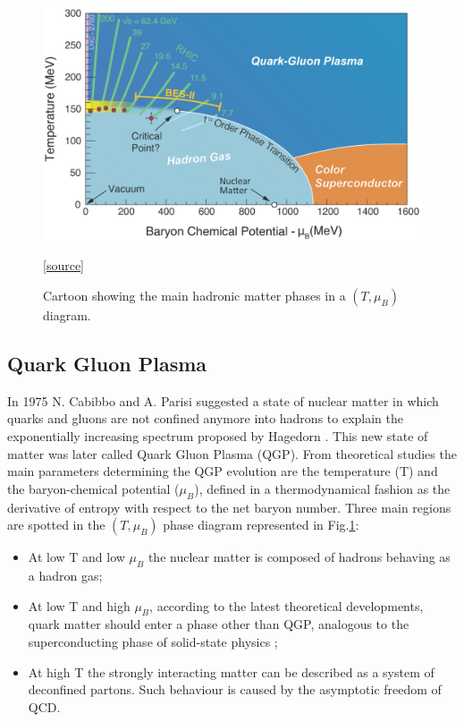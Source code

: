 \begin{figure}[!t]
\begin{center}
\includegraphics[width=0.85\linewidth]{Chapters/Introduction/Figs/QGPPhases.pdf}
\caption{Cartoon showing the main hadronic matter phases in a $(T,\mu_B)$ diagram.}
\href{https://deixismagazine.org/2016/06/early-universe-soup/dol_plasma/}{[source]}
\label{fig:QGPPhases}
\end{center}
\end{figure}

\subsection{Quark Gluon Plasma}
In 1975 N. Cabibbo and A. Parisi \cite{Cabibbo:1975ig} suggested a state of nuclear matter in which quarks and gluons are not confined anymore into hadrons to explain the exponentially increasing spectrum proposed by Hagedorn \cite{Hagedorn:1965st}.
This new state of matter was later called Quark Gluon Plasma (QGP).
From theoretical studies the main parameters determining the QGP evolution are the temperature (T) and the baryon-chemical potential ($\mu_B$), defined in a thermodynamical fashion as the derivative of entropy with respect to the net baryon number.
Three main regions are spotted in the $(T,\mu_B)$ phase diagram represented in Fig.\ref{fig:QGPPhases}:
\begin{itemize}
    \item At low T and low $\mu_B$ the nuclear matter is composed of hadrons behaving as a hadron gas;
    \item At low T and high $\mu_B$, according to the latest theoretical developments, quark matter should enter a phase other than QGP, analogous to the superconducting phase of solid-state physics \cite{Alford:2007xm};
    \item At high T the strongly interacting matter can be described as a system of deconfined partons. Such behaviour is caused by the asymptotic freedom of QCD.
\end{itemize}

